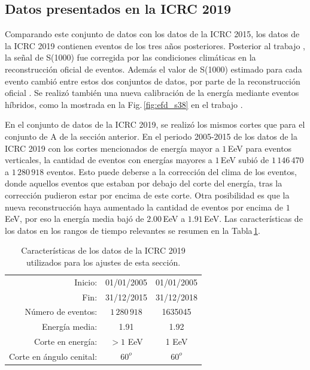 \subsection{Datos presentados en la ICRC 2019}\label{conjuntoB}

Comparando este conjunto de datos con los datos de la ICRC 2015, los datos de la ICRC 2019 contienen eventos de los tres años posteriores. Posterior al trabajo \cite{aab2017impact}, la señal de S(1000) fue corregida por las condiciones climáticas en la reconstrucción oficial de eventos. Además el valor de S(1000) estimado para cada evento cambió entre estos dos conjuntos de datos, por parte de la reconstrucción oficial \cite{isabel}. Se realizó también una nueva calibración de la energía mediante eventos híbridos, como la mostrada en la Fig.\,\ref{fig:efd_s38} en el trabajo  \cite{tobepublished}. 

En el conjunto de datos de la ICRC 2019, se realizó los mismos cortes que para el conjunto de A de la sección anterior. En el periodo 2005-2015 de los datos de la ICRC 2019 con los cortes mencionados de energía mayor a $1\,$EeV para eventos verticales, la cantidad de eventos con energías mayores a $1\,$EeV subió de $1\,146\,470$ a  $1\,280\,918$ eventos. Esto puede deberse a la corrección del clima de los eventos, donde aquellos eventos que estaban por debajo del corte del energía, tras la corrección pudieron estar por encima de este corte. Otra posibilidad es que la nueva reconstrucción haya aumentado la cantidad de eventos por encima de $1\,$EeV, por eso la energía media bajó de $2.00\,$EeV a $1.91\,$EeV.  Las características de los datos en los rangos de tiempo relevantes se resumen en la Tabla\,\ref{tabla:caracteristicas_ICRC_2019}. 

   \begin{table}[H]
       \centering
       \begin{tabular}{r|c|c}
        Inicio:              & 01/01/2005      & 01/01/2005\\
        Fin:                 & 31/12/2015      & 31/12/2018\\  
        Número de eventos:   &  $1\,280\,918$     			    &  1635045     		        \\ 
        Energía media:       &  1.91				        &	1.92				        \\ 
        Corte en energía:    &  $>1$ EeV       		 	    &  1 EeV       		 \\ 
        Corte en ángulo cenital:	&  $60^o$ 				    & $60^o$\\ 
       \end{tabular}
       \caption{Características de los datos de la ICRC 2019 utilizados para los ajustes de esta sección.} \label{tabla:caracteristicas_ICRC_2019}
   \end{table}


